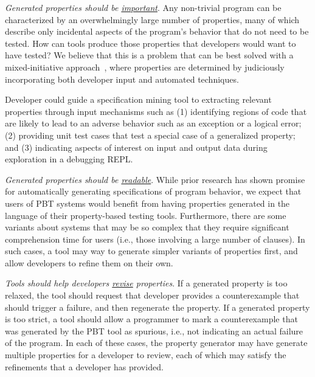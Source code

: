 \textit{Generated properties should be \underline{important}}. Any non-trivial
program can be characterized by an overwhelmingly large number of properties,
many of which describe only incidental aspects of the program's behavior that do
not need to be tested. How can tools produce those properties that developers
would want to have tested? We believe that this is a problem that can be best
solved with a mixed-initiative approach~\cite{allen1999mixed}, where properties
are determined by judiciously incorporating both developer input and automated
techniques.

Developer could guide a specification mining tool to extracting relevant
properties through input mechanisms such as (1) identifying regions of code that
are likely to lead to an adverse behavior such as an exception or a logical
error; (2) providing unit test cases that test a special case of a generalized
property; and (3) indicating aspects of interest on input and output data during
exploration in a debugging REPL.

\textit{Generated properties should be \underline{readable}}. While prior research
has shown promise for automatically generating specifications of program
behavior, we expect that users of PBT systems would benefit from having
properties generated in the language of their property-based testing tools.
Furthermore, there are some variants about systems that may be so complex that
they require significant comprehension time for users (i.e., those involving a
large number of clauses). In such cases, a tool may way to generate simpler
variants of properties first, and allow developers to refine them on their own.

\textit{Tools should help developers \underline{revise} properties}. If a generated
property is too relaxed, the tool should request that developer provides a
counterexample that should trigger a failure, and then regenerate the property.
If a generated property is too strict, a tool should allow a programmer to mark
a counterexample that was generated by the PBT tool as spurious, i.e., not
indicating an actual failure of the program. In each of these cases, the
property generator may have generate multiple properties for a developer to
review, each of which may satisfy the refinements that a developer has provided.

